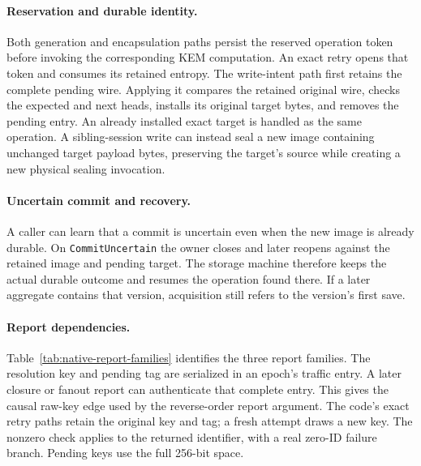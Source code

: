 \documentclass[pdflatex]{sn-jnl}
\theoremstyle{thmstyleone}
\theoremstyle{thmstylethree}
\theoremstyle{thmstyletwo}
\begin{document}
\paragraph{Reservation and durable identity.}
Both generation and encapsulation paths persist the reserved operation token
before invoking the corresponding KEM computation. An exact retry opens
that token and consumes its retained entropy. The write-intent path first
retains the complete pending wire. Applying it compares the retained original
wire, checks the expected and next heads, installs its original target bytes,
and removes the pending entry. An already installed exact target is handled
as the same operation. A sibling-session write can instead seal a new image
containing unchanged target payload bytes, preserving the target's source
while creating a new physical sealing invocation.

\paragraph{Uncertain commit and recovery.}
A caller can learn that a commit is uncertain even when the new
image is already durable. On \texttt{CommitUncertain} the owner closes
and later reopens against the retained image and pending target. The
storage machine therefore keeps the actual durable outcome and resumes
the operation found there. If a later aggregate contains that version,
acquisition still refers to the version's first save.

\paragraph{Report dependencies.}
Table~\ref{tab:native-report-families} identifies the three report families.
The resolution key and pending tag are serialized in an epoch's traffic
entry. A later closure or fanout report can authenticate that complete entry.
This gives the causal raw-key edge used by the reverse-order report argument.
The code's exact retry paths retain the original key and tag; a fresh
attempt draws a new key. The nonzero check applies to the returned identifier,
with a real zero-ID failure branch. Pending keys use the full 256-bit space.
\end{document}
